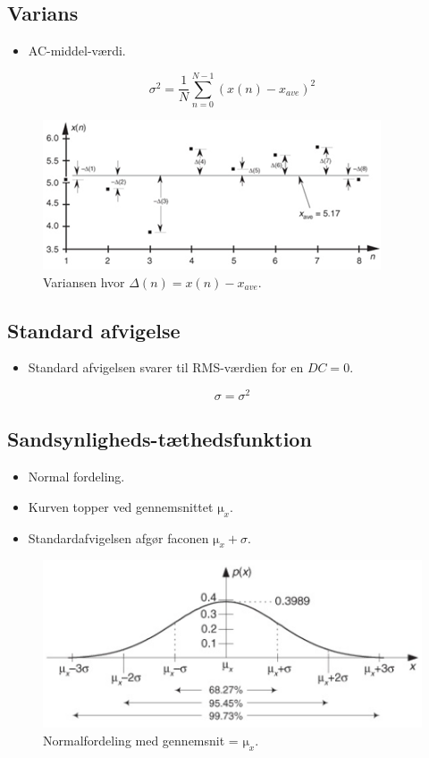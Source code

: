 \documentclass[danish]{article}
\begin{document}
\subsection{Varians}
\begin{itemize}
	\item AC-middel-værdi.
\end{itemize}

\begin{equation}
{\sigma}^2 = \frac{1}{N} \sum_{n=0}^{N-1}(x(n)-x_{ave})^2
\end{equation}

\begin{figure} [H]
	\centering
	\includegraphics[width=0.6\linewidth]{graphics/var}
	\caption{Variansen hvor $\Delta(n) = x(n)-x_{ave}$.}
	\label{fig:var}
\end{figure}

\subsection{Standard afvigelse}
\begin{itemize}
	\item Standard afvigelsen svarer til RMS-værdien for en $DC=0$.
\end{itemize}

\begin{equation}
{\sigma} = {\sigma}^2
\end{equation}

\subsection{Sandsynligheds-tæthedsfunktion}
\begin{itemize}
	\item Normal fordeling.
	\item Kurven topper ved gennemsnittet $\si{\micro}_x$.
	\item Standardafvigelsen afgør faconen $\si{\micro}_x + \sigma$.
\end{itemize}

\begin{figure} [H]
	\centering
	\includegraphics[width=0.6\linewidth]{graphics/pdf}
	\caption{Normalfordeling med gennemsnit = $\si{\micro}_x$.}
	\label{fig:pdf}
\end{figure}
\end{document}

